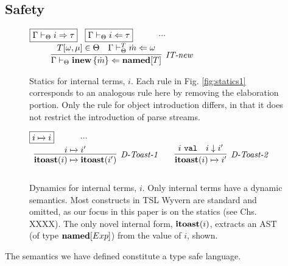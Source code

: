 \subsection{Safety}
\begin{figure}[t]
$\fbox{$\Gamma \vdash_\Theta i \Rightarrow \tau$}$~
$\fbox{$\Gamma \vdash_\Theta i \Leftarrow \tau$}$~~~~~~$\cdots$
$
\begin{array}{c}
~~~~~~\infer[\textit{IT-new}]
	{\Gamma \vdash_\Theta \keyw{inew}\,\{\dot{m}\} \Leftarrow \keyw{named}[T]}
	{T[\omega,\mu] \in \Theta & 
	\Gamma \vdash_\Theta^T \dot{m} \Leftarrow \omega}
\end{array}
$\\[1ex]
\caption{Statics for internal terms, $i$. Each rule in Fig. \ref{fig:statics1} corresponds to an analogous rule here by removing the elaboration portion. Only the rule for object introduction differs, in that it does not restrict the introduction of parse streams. }
\label{it-statics}
\vspace{-5px}
\end{figure}
\begin{figure}[t]
$\fbox{$i \xmapsto{} i$}$~~~~~~$\cdots$~~~~$\begin{array}{c}
\infer[\textit{D-Toast-1}]
	{\keyw{itoast}(i) \xmapsto{} \keyw{itoast}(i') } 
	{i \xmapsto{} i'}
~~~~~~
\infer[\textit{D-Toast-2}]
	{\keyw{itoast}(i)  \xmapsto{} i' } 
	{i\ \texttt{val} & i \downarrow i' }\\[2ex]
\end{array}
$
\caption{Dynamics for internal terms, $i$. Only internal terms have a dynamic semantics. Most constructs in TSL Wyvern are standard and omitted, as our focus in this paper is on the statics (see \cite{pfpl} Chs. XXXX). The only novel internal form, $\textbf{itoast}(i)$, extracts an AST (of type $\textbf{named}[Exp]$) from the value of $i$, shown.}
\label{fig:dynsemantics}
\end{figure}

The semantics we have defined constitute a type safe language.

